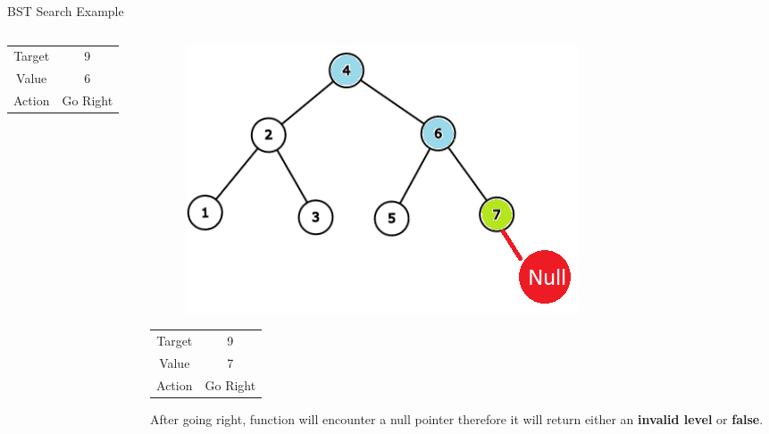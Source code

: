 \documentclass[aspectratio=169]{beamer}%
\begin{document}
\begin{frame}{BST Search Example}
\begin{columns}
\begin{column}{0.32\textwidth}
\begin{figure}[ht]
             \end{figure}
             \begin{table}[ht]
                 \centering
                 \begin{tabular}{cc}
                    Target & 9\\
                    Value  & 6\\
                    Action & Go Right\\
                 \end{tabular}
             \end{table}
         \end{column}
         \hfill
         \begin{column}{0.32\textwidth}
             \begin{figure}[ht]
                 \centering
                 \includegraphics[width = 0.9\linewidth]{bst_src3.png}
             \end{figure}
             \begin{table}[ht]
                 \centering
                 \begin{tabular}{cc}
                    Target & 9\\
                    Value  & 7\\
                    Action & Go Right\\
                 \end{tabular}
             \end{table}
             After going right, function will encounter a null pointer therefore it will return either an \textbf{invalid level} or \textbf{false}.
         \end{column}
    \end{columns}
\end{frame}
\end{document}

